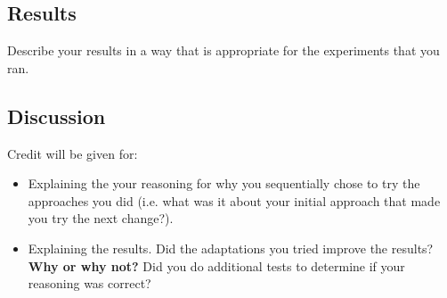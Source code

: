 \documentclass[11pt]{article}
\begin{document}
\subsection{Results}

Describe your results in a way that is appropriate for the experiments that you ran.

\subsection{Discussion}
Credit will be given for:

  \begin{itemize}
  \item Explaining the your reasoning for why you sequentially chose to
    try the approaches you did (i.e. what was it about your initial
    approach that made you try the next change?).  
  \item Explaining the results.  Did the adaptations you tried improve
    the results?  \textbf{Why or why not?}  Did you do additional tests to
    determine if your reasoning was correct?  
  \end{itemize}
 
\end{document}
